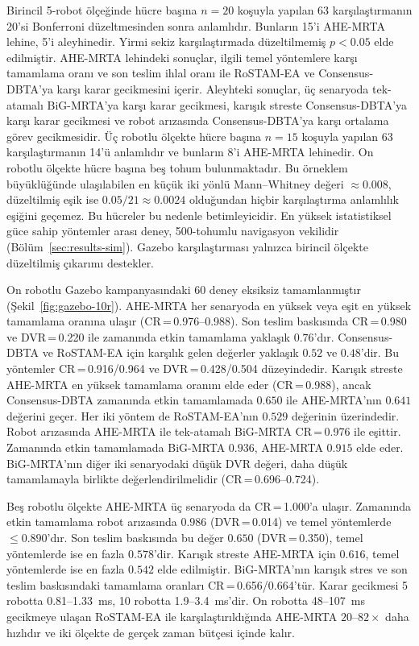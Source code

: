 \documentclass[10pt,letterpaper,onecolumn]{IEEEtran}
\begin{document}


Birincil 5-robot ölçeğinde hücre başına $n{=}20$ koşuyla yapılan 63
karşılaştırmanın 20'si Bonferroni düzeltmesinden sonra anlamlıdır. Bunların
15'i AHE-MRTA lehine, 5'i aleyhinedir. Yirmi sekiz karşılaştırmada düzeltilmemiş
$p{<}0.05$ elde edilmiştir. AHE-MRTA lehindeki sonuçlar, ilgili temel
yöntemlere karşı tamamlama oranı ve son teslim ihlal oranı ile RoSTAM-EA ve
Consensus-DBTA'ya karşı karar gecikmesini içerir. Aleyhteki sonuçlar, üç
senaryoda tek-atamalı BiG-MRTA'ya karşı karar gecikmesi, karışık streste
Consensus-DBTA'ya karşı karar gecikmesi ve robot arızasında Consensus-DBTA'ya
karşı ortalama görev gecikmesidir. Üç robotlu ölçekte hücre başına $n{=}15$
koşuyla yapılan 63 karşılaştırmanın 14'ü anlamlıdır ve bunların 8'i AHE-MRTA
lehinedir. On robotlu ölçekte hücre başına beş tohum bulunmaktadır. Bu örneklem
büyüklüğünde ulaşılabilen en küçük iki yönlü Mann--Whitney değeri
${\approx}0.008$, düzeltilmiş eşik ise $0.05/21{\approx}0.0024$ olduğundan
hiçbir karşılaştırma anlamlılık eşiğini geçemez. Bu hücreler bu nedenle
betimleyicidir. En yüksek istatistiksel güce sahip yöntemler arası deney,
500-tohumlu navigasyon vekilidir (Bölüm~\ref{sec:results-sim}). Gazebo
karşılaştırması yalnızca birincil ölçekte düzeltilmiş çıkarımı destekler.

On robotlu Gazebo kampanyasındaki 60 deney eksiksiz tamamlanmıştır
(Şekil~\ref{fig:gazebo-10r}). AHE-MRTA her senaryoda en yüksek veya eşit en
yüksek tamamlama oranına ulaşır (CR\,=\,0.976--0.988). Son teslim baskısında
CR\,=\,0.980 ve DVR\,=\,0.220 ile zamanında etkin tamamlama yaklaşık
$0.76$'dır. Consensus-DBTA ve RoSTAM-EA için karşılık gelen değerler yaklaşık
$0.52$ ve $0.48$'dir. Bu yöntemler CR\,=\,0.916/0.964 ve
DVR\,=\,0.428/0.504 düzeyindedir. Karışık streste AHE-MRTA en yüksek
tamamlama oranını elde eder (CR\,=\,0.988), ancak Consensus-DBTA zamanında
etkin tamamlamada $0.650$ ile AHE-MRTA'nın $0.641$ değerini geçer. Her iki
yöntem de RoSTAM-EA'nın $0.529$ değerinin üzerindedir. Robot arızasında
AHE-MRTA ile tek-atamalı BiG-MRTA CR\,=\,0.976 ile eşittir. Zamanında etkin
tamamlamada BiG-MRTA $0.936$, AHE-MRTA $0.915$ elde eder. BiG-MRTA'nın diğer
iki senaryodaki düşük DVR değeri, daha düşük tamamlamayla birlikte
değerlendirilmelidir (CR\,=\,0.696--0.724).

Beş robotlu ölçekte AHE-MRTA üç senaryoda da CR\,=\,1.000'a ulaşır. Zamanında
etkin tamamlama robot arızasında $0.986$ (DVR\,=\,0.014) ve temel yöntemlerde
${\leq}0.890$'dır. Son teslim baskısında bu değer $0.650$ (DVR\,=\,0.350),
temel yöntemlerde ise en fazla $0.578$'dir. Karışık streste AHE-MRTA için
$0.616$, temel yöntemlerde ise en fazla $0.542$ elde edilmiştir. BiG-MRTA'nın
karışık stres ve son teslim baskısındaki
tamamlama oranları CR\,=\,0.656/0.664'tür. Karar gecikmesi 5 robotta
0.81--1.33~ms, 10 robotta 1.9--3.4~ms'dir. On robotta 48--107~ms gecikmeye
ulaşan RoSTAM-EA ile karşılaştırıldığında AHE-MRTA $20$--$82{\times}$ daha
hızlıdır ve iki ölçekte de gerçek zaman bütçesi içinde kalır.
\end{document}
